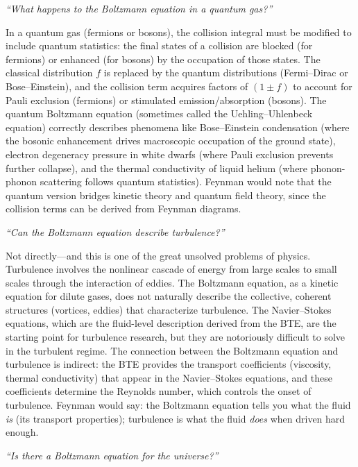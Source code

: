 \textit{``What happens to the Boltzmann equation in a quantum gas?''}

In a quantum gas (fermions or bosons), the collision integral must be modified to include quantum statistics: the final states of a collision are blocked (for fermions) or enhanced (for bosons) by the occupation of those states. The classical distribution $f$ is replaced by the quantum distributions (Fermi--Dirac or Bose--Einstein), and the collision term acquires factors of $(1 \pm f)$ to account for Pauli exclusion (fermions) or stimulated emission/absorption (bosons). The quantum Boltzmann equation (sometimes called the Uehling--Uhlenbeck equation) correctly describes phenomena like Bose--Einstein condensation (where the bosonic enhancement drives macroscopic occupation of the ground state), electron degeneracy pressure in white dwarfs (where Pauli exclusion prevents further collapse), and the thermal conductivity of liquid helium (where phonon-phonon scattering follows quantum statistics). Feynman would note that the quantum version bridges kinetic theory and quantum field theory, since the collision terms can be derived from Feynman diagrams.

\textit{``Can the Boltzmann equation describe turbulence?''}

Not directly---and this is one of the great unsolved problems of physics. Turbulence involves the nonlinear cascade of energy from large scales to small scales through the interaction of eddies. The Boltzmann equation, as a kinetic equation for dilute gases, does not naturally describe the collective, coherent structures (vortices, eddies) that characterize turbulence. The Navier--Stokes equations, which are the fluid-level description derived from the BTE, are the starting point for turbulence research, but they are notoriously difficult to solve in the turbulent regime. The connection between the Boltzmann equation and turbulence is indirect: the BTE provides the transport coefficients (viscosity, thermal conductivity) that appear in the Navier--Stokes equations, and these coefficients determine the Reynolds number, which controls the onset of turbulence. Feynman would say: the Boltzmann equation tells you what the fluid \emph{is} (its transport properties); turbulence is what the fluid \emph{does} when driven hard enough.

\textit{``Is there a Boltzmann equation for the universe?''}

